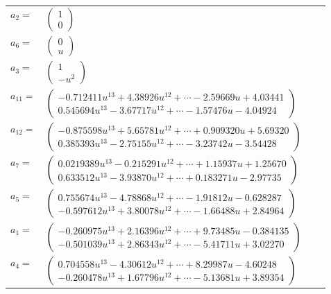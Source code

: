 \documentclass[1p]{elsarticle_modified}
\theoremstyle{definition}
\begin{document}
\begin{tabular}{m{7pt} m{180pt} m{7pt} m{180pt} }
\flushright $a_{2}=$&$\begin{pmatrix}1\\0\end{pmatrix}$ \\
\flushright $a_{6}=$&$\begin{pmatrix}0\\u\end{pmatrix}$ \\
\flushright $a_{3}=$&$\begin{pmatrix}1\\- u^2\end{pmatrix}$ \\
\flushright $a_{11}=$&$\begin{pmatrix}-0.712411 u^{13}+4.38926 u^{12}+\cdots-2.59669 u+4.03441\\0.545694 u^{13}-3.67717 u^{12}+\cdots-1.57476 u-4.04924\end{pmatrix}$ \\
\flushright $a_{12}=$&$\begin{pmatrix}-0.875598 u^{13}+5.65781 u^{12}+\cdots+0.909320 u+5.69320\\0.385393 u^{13}-2.75155 u^{12}+\cdots-3.23742 u-3.54428\end{pmatrix}$ \\
\flushright $a_{7}=$&$\begin{pmatrix}0.0219389 u^{13}-0.215291 u^{12}+\cdots+1.15937 u+1.25670\\0.633512 u^{13}-3.93870 u^{12}+\cdots+0.183271 u-2.97735\end{pmatrix}$ \\
\flushright $a_{5}=$&$\begin{pmatrix}0.755674 u^{13}-4.78868 u^{12}+\cdots-1.91812 u-0.628287\\-0.597612 u^{13}+3.80078 u^{12}+\cdots-1.66488 u+2.84964\end{pmatrix}$ \\
\flushright $a_{1}=$&$\begin{pmatrix}-0.260975 u^{13}+2.16396 u^{12}+\cdots+9.73485 u-0.384135\\-0.501039 u^{13}+2.86343 u^{12}+\cdots-5.41711 u+3.02270\end{pmatrix}$ \\
\flushright $a_{4}=$&$\begin{pmatrix}0.704558 u^{13}-4.30612 u^{12}+\cdots+8.29987 u-4.60248\\-0.260478 u^{13}+1.67796 u^{12}+\cdots-5.13681 u+3.89354\end{pmatrix}$ \\

\end{tabular}
\end{document}
